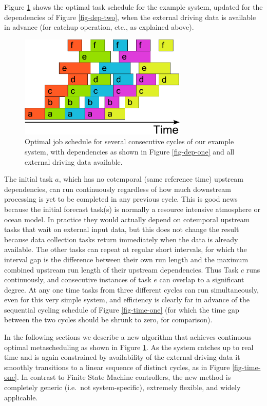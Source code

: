 \documentclass[11pt,a4paper]{article}
\begin{document}
Figure \ref{fig-time-two} shows the optimal task schedule for the
example system, updated for the dependencies of Figure
\ref{fig-dep-two}, when the external driving data is available in
advance (for catchup operation, etc., as explained above).
\begin{figure} 
    \begin{center} 
        \includegraphics[width=8cm]{timeline-two}
    \end{center} 
    \caption{\small Optimal job schedule for several consecutive cycles
    of our example system, with dependencies as shown in Figure
    \ref{fig-dep-one} and all external driving data available.} 
    \label{fig-time-two}
\end{figure} 

The initial task $a$, which has no cotemporal (same reference time)
upstream dependencies, can run continuously regardless of how much
downstream processing is yet to be completed in any previous cycle.
This is good news because the initial forecast task(s) is normally a
resource intensive atmosphere or ocean model. In practice they would
actually depend on cotemporal upstream tasks that wait on external input
data, but this does not change the result because data collection tasks
return immediately when the data is already available. The other tasks
can repeat at regular short intervals, for which the interval gap is the
difference between their own run length and the maximum combined
upstream run length of their upstream dependencies.  Thus Task $c$ runs
continuously, and consecutive instances of task $e$ can overlap to a
significant degree. At any one time tasks from three different cycles
can run simultaneously, even for this very simple system, and efficiency
is clearly far in advance of the sequential cycling schedule of Figure
\ref{fig-time-one} (for which the time gap between the two cycles should
be shrunk to zero, for comparison). 

In the following sections we describe a new algorithm that achieves
continuous optimal metascheduling as shown in Figure \ref{fig-time-two}.
As the system catches up to real time and is again constrained by
availability of the external driving data it smoothly transitions to a
linear sequence of distinct cycles, as in Figure \ref{fig-time-one}. In
contrast to Finite State Machine controllers, the new method is
completely generic (i.e.\ not system-specific), extremely flexible, and
widely applicable.  
\end{document}
